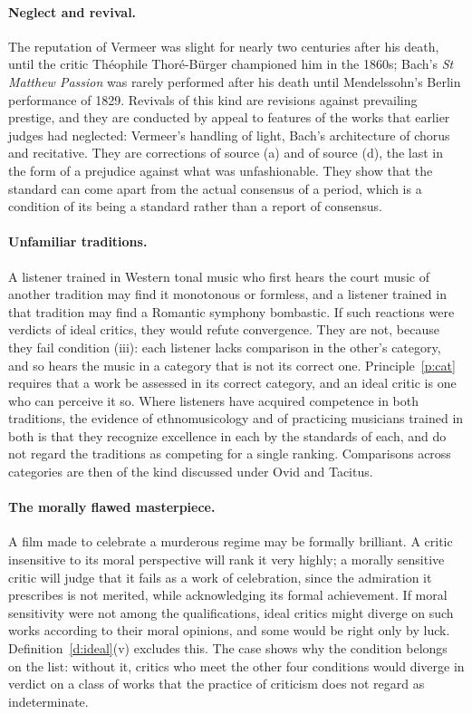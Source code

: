 \documentclass{situationist-preprint}
\begin{document}
\paragraph{Neglect and revival.} The reputation of Vermeer was slight for nearly two centuries after his death, until the critic Th\'eophile Thor\'e-B\"urger championed him in the 1860s; Bach's \emph{St Matthew Passion} was rarely performed after his death until Mendelssohn's Berlin performance of 1829. Revivals of this kind are revisions against prevailing prestige, and they are conducted by appeal to features of the works that earlier judges had neglected: Vermeer's handling of light, Bach's architecture of chorus and recitative. They are corrections of source (a) and of source (d), the last in the form of a prejudice against what was unfashionable. They show that the standard can come apart from the actual consensus of a period, which is a condition of its being a standard rather than a report of consensus.

\paragraph{Unfamiliar traditions.} A listener trained in Western tonal music who first hears the court music of another tradition may find it monotonous or formless, and a listener trained in that tradition may find a Romantic symphony bombastic. If such reactions were verdicts of ideal critics, they would refute convergence. They are not, because they fail condition (iii): each listener lacks comparison in the other's category, and so hears the music in a category that is not its correct one. Principle~\ref{p:cat} requires that a work be assessed in its correct category, and an ideal critic is one who can perceive it so. Where listeners have acquired competence in both traditions, the evidence of ethnomusicology and of practicing musicians trained in both is that they recognize excellence in each by the standards of each, and do not regard the traditions as competing for a single ranking. Comparisons across categories are then of the kind discussed under Ovid and Tacitus.

\paragraph{The morally flawed masterpiece.} A film made to celebrate a murderous regime may be formally brilliant. A critic insensitive to its moral perspective will rank it very highly; a morally sensitive critic will judge that it fails as a work of celebration, since the admiration it prescribes is not merited, while acknowledging its formal achievement. If moral sensitivity were not among the qualifications, ideal critics might diverge on such works according to their moral opinions, and some would be right only by luck. Definition~\ref{d:ideal}(v) excludes this. The case shows why the condition belongs on the list: without it, critics who meet the other four conditions would diverge in verdict on a class of works that the practice of criticism does not regard as indeterminate.
\end{document}
